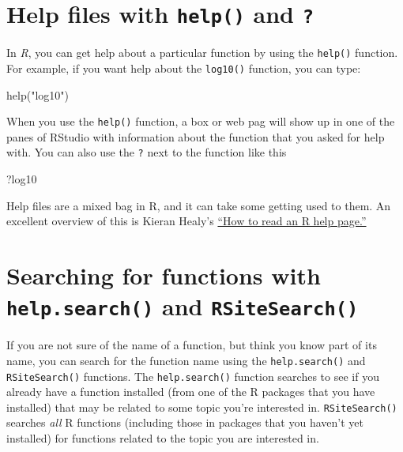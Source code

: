 \documentclass[
]{book}
\newenvironment{Shaded}{\begin{snugshade}}{\end{snugshade}}
\newcommand{\FunctionTok}[1]{\textcolor[rgb]{0.00,0.00,0.00}{#1}}
\newcommand{\NormalTok}[1]{#1}
\newcommand{\StringTok}[1]{\textcolor[rgb]{0.31,0.60,0.02}{#1}}
\begin{document}
\hypertarget{help-files-with-help-and}{%
\section{\texorpdfstring{Help files with \texttt{help()} and \texttt{?}}{Help files with help() and ?}}\label{help-files-with-help-and}}

In \emph{R}, you can get help about a particular function by using the \texttt{help()} function. For example, if you want help about the \texttt{log10()} function, you can type:

\begin{Shaded}
\begin{Highlighting}[]
\FunctionTok{help}\NormalTok{(}\StringTok{"log10"}\NormalTok{)}
\end{Highlighting}
\end{Shaded}

When you use the \texttt{help()} function, a box or web pag will show up in one of the panes of RStudio with information about the function that you asked for help with. You can also use the \texttt{?} next to the function like this

\begin{Shaded}
\begin{Highlighting}[]
\NormalTok{?log10}
\end{Highlighting}
\end{Shaded}

Help files are a mixed bag in R, and it can take some getting used to them. An excellent overview of this is Kieran Healy's \href{https://socviz.co/appendix.html}{``How to read an R help page.''}

\hypertarget{searching-for-functions-with-help.search-and-rsitesearch}{%
\section{\texorpdfstring{Searching for functions with \texttt{help.search()} and \texttt{RSiteSearch()}}{Searching for functions with help.search() and RSiteSearch()}}\label{searching-for-functions-with-help.search-and-rsitesearch}}

If you are not sure of the name of a function, but think you know part of its name, you can search for the function name using the \texttt{help.search()} and \texttt{RSiteSearch()} functions. The \texttt{help.search()} function searches to see if you already have a function installed (from one of the R packages that you have installed) that may be related to some topic you're interested in. \texttt{RSiteSearch()} searches \emph{all} R functions (including those in packages that you haven't yet installed) for functions related to the topic you are interested in.
\end{document}

